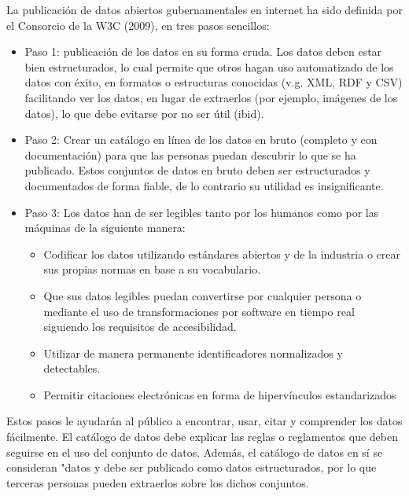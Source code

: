 La publicación de datos abiertos gubernamentales en internet ha sido definida por el Consorcio de la W3C (2009), en tres pasos sencillos:

  \begin{itemize}
  
  	\item Paso 1: publicación de los datos en su forma cruda. Los datos deben estar bien estructurados, lo cual permite que otros hagan uso automatizado de los datos con éxito, en formatos o estructuras conocidas (v.g. XML, RDF y CSV) facilitando ver los datos, en lugar de extraerlos (por ejemplo, imágenes de los datos), lo que debe evitarse por no ser útil (ibid).

	\item Paso 2: Crear un catálogo en línea de los datos en bruto (completo y con documentación) para que las personas puedan descubrir lo que se ha publicado. Estos conjuntos de datos en bruto deben ser estructurados y documentados de forma fiable, de lo contrario su utilidad es insignificante.

	\item Paso 3: Los datos han de ser legibles tanto por los humanos como por las máquinas de la siguiente manera:

		\begin{itemize}
			\item Codificar los datos utilizando estándares abiertos y de la industria o crear sus propias normas en base a su vocabulario.
			\item Que sus datos legibles puedan convertirse por cualquier persona o mediante el uso de transformaciones por software en tiempo real siguiendo los requisitos de accesibilidad.
			\item Utilizar de manera permanente identificadores normalizados y detectables.
			\item Permitir citaciones electrónicas en forma de hipervínculos estandarizados
		\end{itemize}
	\end{itemize}	

Estos pasos le ayudarán al público a encontrar, usar, citar y comprender los datos fácilmente. El catálogo de datos debe explicar las reglas o reglamentos que deben seguirse en el uso del conjunto de datos. Además, el catálogo de datos en sí se consideran "datos y debe ser publicado como datos estructurados, por lo que terceras personas pueden extraerlos sobre los dichos conjuntos.
